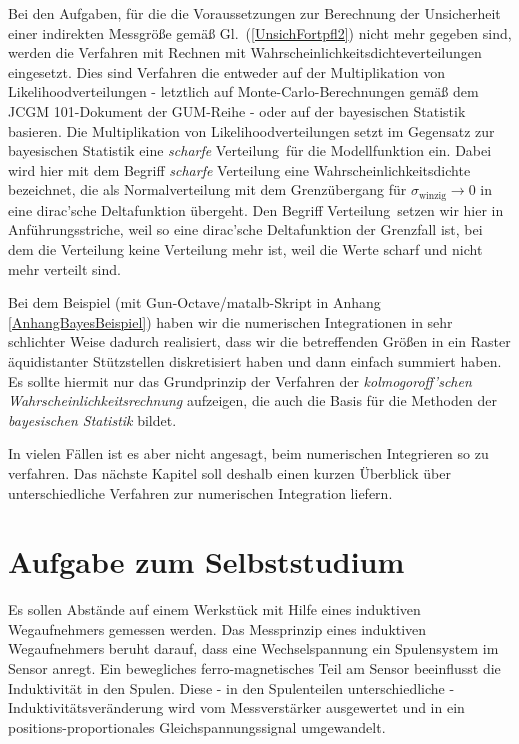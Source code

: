 Bei den Aufgaben, für die die Voraussetzungen zur Berechnung der Unsicherheit einer
indirekten Messgröße gemäß Gl.~(\ref{UnsichFortpfl2}) nicht mehr gegeben sind, werden die
Verfahren mit Rechnen mit Wahrscheinlichkeitsdichteverteilungen eingesetzt.
Dies sind Verfahren die entweder auf der Multiplikation von Likelihoodverteilungen - letztlich
auf Monte-Carlo-Berechnungen gemäß dem JCGM 101-Dokument der GUM-Reihe - oder auf der
bayesischen Statistik basieren.
Die Multiplikation von Likelihoodverteilungen setzt im Gegensatz zur bayesischen Statistik eine
\textsl{scharfe} \glqq Verteilung\grqq ~für die Modellfunktion ein. Dabei wird hier mit dem Begriff
\textsl{scharfe} Verteilung eine Wahrscheinlichkeitsdichte bezeichnet, die als Normalverteilung
mit dem Grenzübergang für $\sigma_\mathrm{winzig} \rightarrow 0$ in eine dirac'sche Deltafunktion übergeht.
Den Begriff \glqq Verteilung\grqq ~setzen wir hier in Anführungsstriche, weil
so eine dirac'sche Deltafunktion der Grenzfall ist, bei dem die Verteilung keine Verteilung mehr ist,
weil die Werte scharf und nicht mehr verteilt sind.

Bei dem Beispiel (mit Gun-Octave/matalb-Skript in Anhang \ref{AnhangBayesBeispiel}) 
haben wir die numerischen Integrationen in
sehr schlichter Weise dadurch realisiert, dass wir die betreffenden Größen in ein Raster äquidistanter
Stützstellen diskretisiert haben und dann einfach summiert haben. Es sollte hiermit nur das Grundprinzip der
Verfahren der \textsl{kolmogoroff'schen Wahrscheinlichkeitsrechnung} aufzeigen, die auch die Basis für die
Methoden der \textsl{bayesischen Statistik} bildet.

In vielen Fällen ist es aber nicht angesagt, beim numerischen Integrieren so zu verfahren.
Das nächste Kapitel soll deshalb einen kurzen
Überblick über unterschiedliche Verfahren zur numerischen Integration liefern.


\section{Aufgabe zum Selbststudium}
\label{AufgVor7}
Es sollen Abstände auf einem Werkstück mit Hilfe eines induktiven Wegaufnehmers gemessen werden.
Das Messprinzip eines induktiven Wegaufnehmers beruht darauf, dass
eine Wechselspannung ein Spulensystem im Sensor anregt.
Ein bewegliches ferro-magnetisches Teil am Sensor
beeinflusst die Induktivität in den Spulen.
Diese - in den Spulenteilen unterschiedliche - Induktivitätsveränderung wird vom
Messverstärker ausgewertet und in ein positions-proportionales Gleichspannungssignal
umgewandelt.

